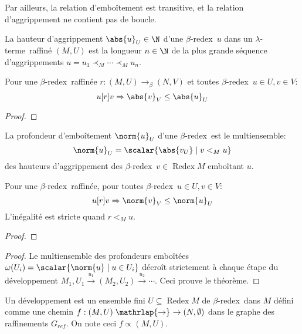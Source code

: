 \documentclass[math, info]{cours}
\def\lambdaterme{$\lambda$-terme\ }
\def\betaredex{$\beta$-redex\ }
\newcommand{\rrightarrow}{\mathrel{\mathrlap{\rightarrow}\mkern1mu\rightarrow}}
\DeclareMathOperator{\Redex}{Redex}
\begin{document}
Par ailleurs, la relation d'emboîtement est transitive, et la relation d'aggrippement ne contient pas de boucle.
\begin{definition}
	La hauteur d'aggrippement $\abs{u}_{U} \in \N$ d'une \betaredex $u$ dans un \lambdaterme raffiné $(M, U)$ est la longueur $n \in \N$ de la plus grande séquence d'aggrippements $u = u_{1} \prec_{M} \cdots \prec_{M} u_{n}$.
	\label{def:grippingheight}
\end{definition}
\begin{lemme}
	Pour une \betaredex raffinée $r : (M, U) \to_{\beta} (N, V)$ et toutes \betaredex $u \in U, v\in V$:
	\begin{equation*}
		u[r] v \Rightarrow \abs{v}_{V} \leq \abs{u}_{U}
	\end{equation*}
\end{lemme}
\begin{proof}

\end{proof}
\begin{definition}
	La profondeur d'emboîtement $\norm{u}_{U}$ d'une \betaredex est le multiensemble:
	\begin{equation*}
		\norm{u}_{U} = \scalar{\abs{v_{U}} \mid v <_{M} u}
	\end{equation*}
	des hauteurs d'aggrippement des \betaredex $v \in \Redex M$ emboîtant $u$.
	\label{def:profondeuremboitement}
\end{definition}
\begin{lemme}
	Pour une \betaredex raffinée, pour toutes \betaredex $u \in U, v\in V$:
	\begin{equation*}
		u[r] v \Rightarrow \norm{v}_{V} \leq \norm{u}_{U}
	\end{equation*}
	L'inégalité est stricte quand $r <_{M} u$.
\end{lemme}
\begin{proof}

\end{proof}

\begin{proof}
	Le multiensemble des profondeurs emboîtées $\omega(U_{i}) = \scalar{\norm{u} \mid u\in U_{i}}$ décroît strictement à chaque étape du développement $M_{1}, U_{1} \xrightarrow{u_{1}} (M_{2}, U_{2}) \xrightarrow{u_{2}} \cdots$.
	Ceci prouve le théorème.
\end{proof}

\begin{definition}
	Un développement est un ensemble fini $U \subseteq \Redex M$ de \betaredex dans $M$ défini comme une chemin $f: (M, U) \rrightarrow (N, \emptyset)$ dans le graphe des raffinements $G_{ref}$.
	On note ceci $f \propto (M, U)$.
	\label{def:développement}
\end{definition}
\end{document}
